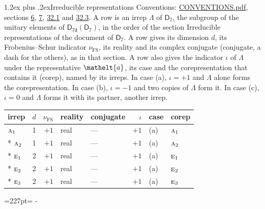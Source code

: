 \documentclass[10pt,a4paper]{article}
\makeatletter
\renewcommand\section{\@startsection{section}{1}{\z@}{-3ex plus -1ex minus -.2ex}%
  {1.2ex plus .2ex}{\normalfont\large\sffamily\bfseries\color{parttitle}}}
\newcommand{\needspace}[1]{\par\penalty-100\begingroup\dimen0=#1\relax\dimen2=\pagegoal
  \advance\dimen2-\pagetotal\ifdim\dimen0>\dimen2\relax\ifdim\dimen2>0pt\vfil\break\fi\fi
  \endgroup}
\numberwithin{equation}{section}
\newcommand{\eltfont}[1]{{\let\sigma\eltsigma\mathelt{#1}}}
\newcommand{\grp}[1]{\mathsf{#1}}
\newcommand{\irr}[1]{\text{\normalfont\scshape #1}}
\newcommand{\elt}[1]{\eltfont{#1}}
\newcommand{\fsind}{\nu_{\mathrm{FS}}}
\makeatother
\begin{document}
\section{Irreducible representations}\label{s:irreps}
Conventions: \href{../../CONVENTIONS.pdf}{CONVENTIONS.pdf}, sections \href{../../../rotation/CONVENTIONS.pdf\#conv.6}{6}, \href{../../../rotation/CONVENTIONS.pdf\#conv.7}{7}, \href{../../CONVENTIONS.pdf\#conv.32.1}{32.1} and \href{../../CONVENTIONS.pdf\#conv.32.3}{32.3}.
\leavevmode\label{n:irrep.Delta}A row is an irrep $\Lambda$ of $\grp{D_{7}}$, the subgroup of the unitary elements of $\grp{D_{7d}}(\grp{D_{7}})$, in the order of the section Irreducible representations of the document of \href{../../../rotation/data/pdf/D7.pdf}{$\grp{D_{7}}$}. \label{n:index.dimension}\label{n:index.frobenius}\label{n:head.irrep}\label{n:head.reality}\label{n:head.conjugate}A row gives its dimension $d$, its Frobenius--Schur indicator $\fsind$, its reality and its complex conjugate (conjugate, a dash for the others), as in that section. \label{n:head.case.corep}\label{n:head.corep}A row also gives the indicator $\iota$ of $\Lambda$ under the representative $\elt{a}$, its case and the corepresentation that contains it (corep), named by its irreps. In case (a), $\iota = +1$ and $\Lambda$ alone forms the corepresentation. In case (b), $\iota = -1$ and two copies of $\Lambda$ form it. In case (c), $\iota = 0$ and $\Lambda$ forms it with its partner, another irrep.
\setlength{\emergencystretch}{2em}\par\setlength{\emergencystretch}{0pt}
{\small\renewcommand{\arraystretch}{1.25}\setlength{\tabcolsep}{4pt}\begin{longtable}{@{}lrrllrll@{}}\toprule
irrep & $d$ & $\fsind$ & reality & conjugate & $\iota$ & case & corep\\\midrule\endhead
\bottomrule\endfoot\endlastfoot
$\irr{a}_{1}$ & 1 & $+1$ & real & --- & $+1$ & (a) & $\irr{a}_{1}$\\*
$\irr{a}_{2}$ & 1 & $+1$ & real & --- & $+1$ & (a) & $\irr{a}_{2}$\\*
$\irr{e}_{1}$ & 2 & $+1$ & real & --- & $+1$ & (a) & $\irr{e}_{1}$\\*
$\irr{e}_{2}$ & 2 & $+1$ & real & --- & $+1$ & (a) & $\irr{e}_{2}$\\*
$\irr{e}_{3}$ & 2 & $+1$ & real & --- & $+1$ & (a) & $\irr{e}_{3}$\\
\bottomrule\end{longtable}}
\needspace{227pt}
\end{document}

